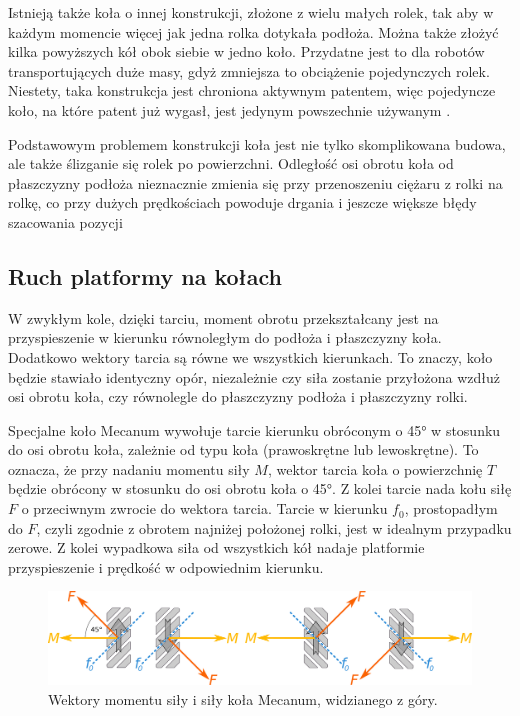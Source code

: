 	Istnieją także koła o innej konstrukcji, złożone z wielu małych rolek, tak aby w każdym momencie więcej jak jedna rolka dotykała podłoża.
	Można także złożyć kilka powyższych kół obok siebie w jedno koło.
	Przydatne jest to dla robotów transportujących duże masy, gdyż zmniejsza to obciążenie pojedynczych rolek.
	Niestety, taka konstrukcja jest chroniona aktywnym patentem, więc pojedyncze koło, na które patent już wygasł, jest jedynym powszechnie używanym \cite{paletobot}.

	Podstawowym problemem konstrukcji koła jest nie tylko skomplikowana budowa, ale także ślizganie się rolek po powierzchni.
	Odległość osi obrotu koła od płaszczyzny podłoża nieznacznie zmienia się przy przenoszeniu ciężaru z rolki na rolkę, co przy dużych prędkościach powoduje drgania i jeszcze większe błędy szacowania pozycji

	\subsection{Ruch platformy na kołach}
		W zwykłym kole, dzięki tarciu, moment obrotu przekształcany jest na przyspieszenie w kierunku równoległym do podłoża i płaszczyzny koła.
		Dodatkowo wektory tarcia są równe we wszystkich kierunkach. To znaczy, koło będzie stawiało identyczny opór, niezależnie czy siła
		zostanie przyłożona wzdłuż osi obrotu koła, czy równolegle do płaszczyzny podłoża i płaszczyzny rolki.
		
		Specjalne koło Mecanum wywołuje tarcie kierunku obróconym o 45° w stosunku do osi obrotu koła, zależnie od typu koła (prawoskrętne lub lewoskrętne). 
		To oznacza, że przy nadaniu momentu siły $M$, wektor tarcia koła o powierzchnię $T$ będzie obrócony w stosunku do osi obrotu koła o 45°.
		Z kolei tarcie nada kołu siłę $F$ o przeciwnym zwrocie do wektora tarcia.
		Tarcie w kierunku $f_0$, prostopadłym do $F$, czyli zgodnie z obrotem najniżej położonej rolki, jest w idealnym przypadku zerowe.
		Z kolei wypadkowa siła od wszystkich kół nadaje platformie przyspieszenie i prędkość w odpowiednim kierunku.

		\begin{figure}[H]
		\centering
		\includegraphics[width=\textwidth]{graphics/vectors.pdf}
		\caption{Wektory momentu siły i siły koła Mecanum, widzianego z góry.}
		\label{fig:wheel_vectors}
		\end{figure} 


